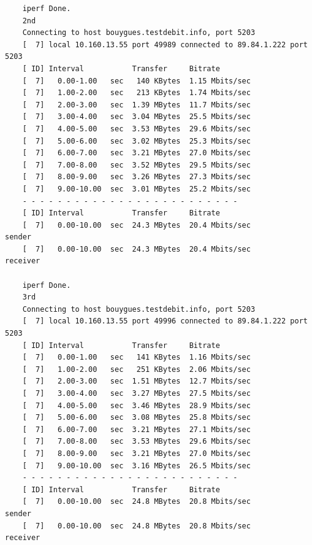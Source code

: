 \documentclass[paper=a4, fontsize=10pt]{scrartcl} %
\numberwithin{equation}{section} %
\numberwithin{figure}{section} %
\numberwithin{table}{section} %
\begin{document}
\begin{lstlisting}
    iperf Done.
    2nd
    Connecting to host bouygues.testdebit.info, port 5203
    [  7] local 10.160.13.55 port 49989 connected to 89.84.1.222 port 5203
    [ ID] Interval           Transfer     Bitrate
    [  7]   0.00-1.00   sec   140 KBytes  1.15 Mbits/sec                  
    [  7]   1.00-2.00   sec   213 KBytes  1.74 Mbits/sec                  
    [  7]   2.00-3.00   sec  1.39 MBytes  11.7 Mbits/sec                  
    [  7]   3.00-4.00   sec  3.04 MBytes  25.5 Mbits/sec                  
    [  7]   4.00-5.00   sec  3.53 MBytes  29.6 Mbits/sec                  
    [  7]   5.00-6.00   sec  3.02 MBytes  25.3 Mbits/sec                  
    [  7]   6.00-7.00   sec  3.21 MBytes  27.0 Mbits/sec                  
    [  7]   7.00-8.00   sec  3.52 MBytes  29.5 Mbits/sec                  
    [  7]   8.00-9.00   sec  3.26 MBytes  27.3 Mbits/sec                  
    [  7]   9.00-10.00  sec  3.01 MBytes  25.2 Mbits/sec                  
    - - - - - - - - - - - - - - - - - - - - - - - - -
    [ ID] Interval           Transfer     Bitrate
    [  7]   0.00-10.00  sec  24.3 MBytes  20.4 Mbits/sec                  sender
    [  7]   0.00-10.00  sec  24.3 MBytes  20.4 Mbits/sec                  receiver
    
    iperf Done.
    3rd
    Connecting to host bouygues.testdebit.info, port 5203
    [  7] local 10.160.13.55 port 49996 connected to 89.84.1.222 port 5203
    [ ID] Interval           Transfer     Bitrate
    [  7]   0.00-1.00   sec   141 KBytes  1.16 Mbits/sec                  
    [  7]   1.00-2.00   sec   251 KBytes  2.06 Mbits/sec                  
    [  7]   2.00-3.00   sec  1.51 MBytes  12.7 Mbits/sec                  
    [  7]   3.00-4.00   sec  3.27 MBytes  27.5 Mbits/sec                  
    [  7]   4.00-5.00   sec  3.46 MBytes  28.9 Mbits/sec                  
    [  7]   5.00-6.00   sec  3.08 MBytes  25.8 Mbits/sec                  
    [  7]   6.00-7.00   sec  3.21 MBytes  27.1 Mbits/sec                  
    [  7]   7.00-8.00   sec  3.53 MBytes  29.6 Mbits/sec                  
    [  7]   8.00-9.00   sec  3.21 MBytes  27.0 Mbits/sec                  
    [  7]   9.00-10.00  sec  3.16 MBytes  26.5 Mbits/sec                  
    - - - - - - - - - - - - - - - - - - - - - - - - -
    [ ID] Interval           Transfer     Bitrate
    [  7]   0.00-10.00  sec  24.8 MBytes  20.8 Mbits/sec                  sender
    [  7]   0.00-10.00  sec  24.8 MBytes  20.8 Mbits/sec                  receiver
    

\end{lstlisting}
\end{document}
